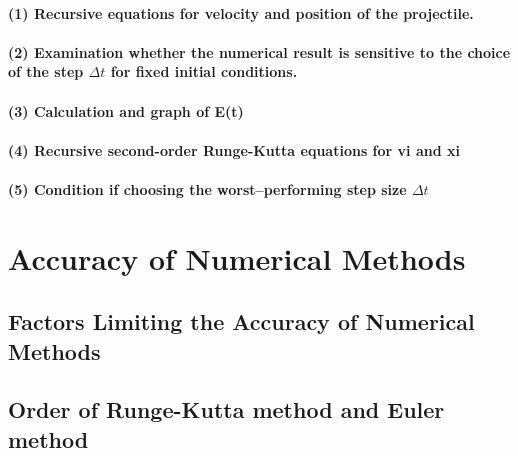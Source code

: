 \documentclass{article}
\begin{document}
\paragraph{(1) Recursive equations for velocity and position of the projectile.}
\paragraph{(2) Examination whether the numerical result is sensitive to the choice of the step $\Delta t$ for fixed initial conditions.}
\paragraph{(3) Calculation and graph of E(t)}
\paragraph{(4) Recursive second-order Runge-Kutta equations for vi and xi}
\paragraph{(5) Condition if choosing the worst–performing step size $\Delta t$ }
\section{Accuracy of Numerical Methods}

\subsection{Factors Limiting the Accuracy of Numerical Methods}

\subsection{Order of Runge-Kutta method and Euler method}
\end{document}

